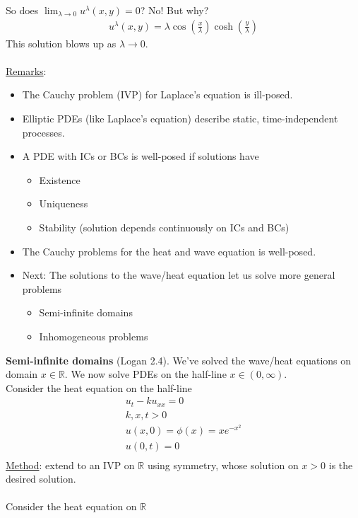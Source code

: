 \documentclass[12pt, letterpaper]{article}
\begin{document}
So does $\lim_{\lambda \rightarrow 0} u^\lambda(x,y) = 0$? No! But why?
\begin{align*}
    u^\lambda(x,y) = \lambda\cos(\frac x\lambda)\cosh(\frac y\lambda)
\end{align*}
This solution blows up as $\lambda \rightarrow 0$. \\ \\
\underline{Remarks}:
\begin{itemize}
    \item The Cauchy problem (IVP) for Laplace's equation is ill-posed.
    \item Elliptic PDEs (like Laplace's equation) describe static, time-independent processes.
    \item A PDE with ICs or BCs is well-posed if solutions have 
    \begin{itemize}
        \item Existence
        \item Uniqueness
        \item Stability (solution depends continuously on ICs and BCs)
    \end{itemize}
    \item The Cauchy problems for the heat and wave equation is well-posed.
    \item Next: The solutions to the wave/heat equation let us solve more general problems
    \begin{itemize}
        \item Semi-infinite domains
        \item Inhomogeneous problems
    \end{itemize}
\end{itemize}
\textbf{Semi-infinite domains} (Logan 2.4). We've solved the wave/heat equations on domain $x \in \mathbb{R}$. We now solve PDEs on
the half-line $x \in (0,\infty)$.  \\
 Consider the heat equation on the half-line
\begin{align*}
    u_t - ku_{xx} = 0 \\
    k,x,t > 0 \\
    u(x,0) = \phi(x) = xe^{-x^2} \\
    u(0,t) = 0 \\
\end{align*}
\underline{Method}: extend to an IVP on $\mathbb{R}$ using symmetry, whose solution on $x > 0$
is the desired solution. \\ \\ 
Consider the heat equation on $\mathbb{R}$
\end{document}
